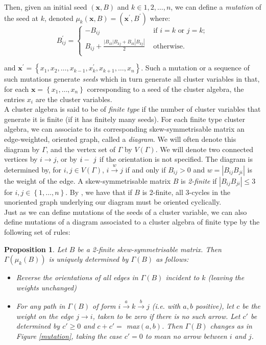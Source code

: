 \documentclass[11pt]{amsart}
\newtheorem{prop}[thm]{Proposition}
\theoremstyle{definition}
\newcommand\V{V(\Gamma)}
\begin{document}
Then, given an initial seed $(\textbf{x}, B)$ and $k \in {1,2,\ldots,n}$, we can define a \textit{mutation} of the seed at $k$, denoted $\mu_k(\boldsymbol{x}, B) = (\textbf{x}^{\prime}, B^{\prime})$ where:
\begin{displaymath}
B_{ij}^{\prime} = \begin{cases} - B_{ij} & \mbox{ if } i = k \mbox{ or } j = k;\\
B_{ij} + \frac{|B_{ik}|B_{kj} + B_{ik}|B_{kj}|}{2} & \mbox{ otherwise. }\\
\end{cases}
\end{displaymath}

and $\textbf{x}^{\prime} = \left\{ x_1, x_2, \ldots, x_{k-1}, x_k^{\prime}, x_{k+1}, \ldots, x_n \right\}$.
Such a mutation or a sequence of such mutations generate \textit{seeds} which in turn generate all cluster variables in that, for each $\textbf{x} = \left\{ x_1, \ldots, x_n \right\}$ corresponding to a seed of the cluster algebra, the entries $x_i$ are the cluster variables. \\

 A cluster algebra is said to be of \textit{finite type} if the number of cluster variables that generate it is finite (if it has finitely many seeds). For each finite type cluster algebra, we can associate to its corresponding skew-symmetrisable matrix an edge-weighted, oriented graph, called a \textit{diagram}. We will often denote this diagram by $\Gamma$, and the vertex set of $\Gamma$ by $\V$. We will denote two connected vertices by $i \rightarrow j$, or by $i\--\ j$ if the orientation is not specified. The diagram is determined by, for $i, j \in \V$, $i \xrightarrow{w} j$ if and only if $B_{ij} > 0$ and $w = |B_{ij}B_{ji}|$ is the weight of the edge. A skew-symmetrisable matrix $B$ is \textit{2-finite} if $|B_{ij}B_{ji}| \leq 3$ for $i, j \in \left\{ 1, \ldots, n \right\}$. By \cite[7.5]{FZ02}, we have that if $B$ is 2-finite, all 3-cycles in the unoriented graph underlying our diagram must be oriented cyclically. \\

Just as we can define mutations of the seeds of a cluster variable, we can also define mutations of a diagram associated to a cluster algebra of finite type by the following set of rules:
\begin{prop}\cite[Proposition 1.4]{BM13}
Let $B$ be a 2-finite skew-symmetrisable matrix. Then $\Gamma(\mu_k(B))$ is uniquely determined by $\Gamma(B)$ as follows:
\begin{itemize}
\item Reverse the orientations of all edges in $\Gamma(B)$ incident to $k$ (leaving the weights unchanged)
\item For any path in $\Gamma(B)$ of form $i \xrightarrow{a} k \xrightarrow{b} j$ (i.e. with $a,b$ positive), let $c$ be the weight on the edge $j \rightarrow i$, taken to be zero if there is no such arrow. Let $c'$ be determined by $c'\geq 0$ and
$c+c' =$ max$(a,b)$.
Then $\Gamma(B)$ changes as in Figure \ref{mutation}, taking the case $c' = 0$ to mean no arrow between $i$ and $j$.
\end{itemize}
\end{prop}
\end{document}
